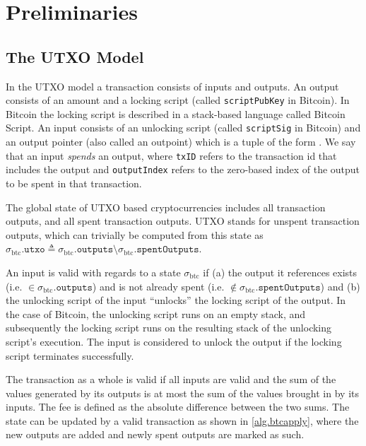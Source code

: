 \section{Preliminaries}
\subsection{The UTXO Model}
In the UTXO model a transaction consists of inputs and outputs. An output consists of an amount and a locking script (called \texttt{scriptPubKey} in Bitcoin). In Bitcoin the locking script is described in a stack-based language called Bitcoin Script. An input consists of an unlocking script (called \texttt{scriptSig} in Bitcoin) and an output pointer (also called an outpoint) which is a tuple of the form . We say that an input \emph{spends} an output, where \texttt{txID} refers to the transaction id that includes the output and \texttt{outputIndex} refers to the zero-based index of the output to be spent in that transaction.

\def\btcstate{\ensuremath{\sigma_\text{btc}}}
\def\btcapply{\text{apply}\textsubscript{btc}}
\def\outputs{\texttt{outputs}}
\def\inputs{\texttt{inputs}}
\def\spentOutputs{\texttt{spentOutputs}}
\def\utxo{\texttt{utxo}}
The global state of UTXO based cryptocurrencies includes all transaction outputs, and all spent transaction outputs. UTXO stands for unspent transaction outputs, which can trivially be computed from this state as $\btcstate.\utxo \triangleq \btcstate.\outputs \setminus \btcstate.\spentOutputs$.

An input is valid with regards to a state $\btcstate$ if (a) the output it references exists (i.e. $\in \btcstate.\outputs$) and is not already spent (i.e. $\notin \btcstate.\spentOutputs$) and (b) the unlocking script of the input ``unlocks'' the locking script of the output. In the case of Bitcoin, the unlocking script runs on an empty stack, and subsequently the locking script runs on the resulting stack of the unlocking script's execution. The input is considered to unlock the output if the locking script terminates successfully.

The transaction as a whole is valid if all inputs are valid and the sum of the values generated by its outputs is at most the sum of the values brought in by its inputs. The fee is defined as the absolute difference between the two sums. The state can be updated by a valid transaction as shown in \cref{alg.btcapply}, where the new outputs are added and newly spent outputs are marked as such.

